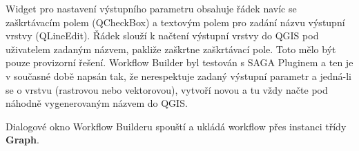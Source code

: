 Widget pro nastavení výstupního parametru obsahuje řádek navíc se zaškrtávacím polem (QCheckBox) a textovým polem pro zadání názvu výstupní vrstvy (QLineEdit). Řádek slouží k načtení výstupní vrstvy  do QGIS pod uživatelem zadaným názvem, pakliže zaškrtne zaškrtávací pole. Toto mělo být pouze provizorní řešení. Workflow Builder byl testován s SAGA Pluginem a ten je v současné době napsán tak, že nerespektuje zadaný výstupní parametr a jedná-li se o vrstvu (rastrovou nebo vektorovou), vytvoří novou a tu vždy načte pod náhodně vygenerovaným názvem do QGIS.

Dialogové okno Workflow Builderu spouští a ukládá workflow přes instanci třídy \textbf{Graph}. 